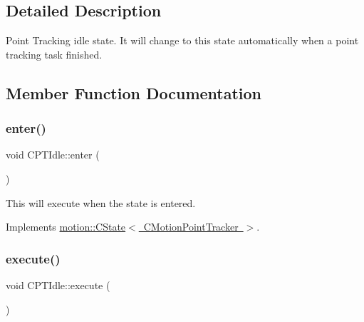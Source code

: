 \subsection{Detailed Description}
Point Tracking idle state. It will change to this state automatically when a point tracking task finished. 

\subsection{Member Function Documentation}
\mbox{\label{classmotion_1_1CPTIdle_ad77ab399843dcf692d683747dbf51dd4}} 
\subsubsection{\texorpdfstring{enter()}{enter()}}
{\footnotesize\ttfamily void C\+P\+T\+Idle\+::enter (\begin{DoxyParamCaption}\item[{\mbox{\hyperlink{classmotion_1_1CMotionPointTracker}{C\+Motion\+Point\+Tracker}} $\ast$}]{ }\end{DoxyParamCaption})\hspace{0.3cm}{\ttfamily [virtual]}}

This will execute when the state is entered. 

Implements \mbox{\hyperlink{classmotion_1_1CState_a53d5fcfec223b58ccdd364a8430fd23c}{motion\+::\+C\+State$<$ C\+Motion\+Point\+Tracker $>$}}.

\mbox{\label{classmotion_1_1CPTIdle_af41acb6cf867df293faf85bfbff91940}} 
\subsubsection{\texorpdfstring{execute()}{execute()}}
{\footnotesize\ttfamily void C\+P\+T\+Idle\+::execute (\begin{DoxyParamCaption}\item[{\mbox{\hyperlink{classmotion_1_1CMotionPointTracker}{C\+Motion\+Point\+Tracker}} $\ast$}]{ }\end{DoxyParamCaption})\hspace{0.3cm}{\ttfamily [virtual]}}


